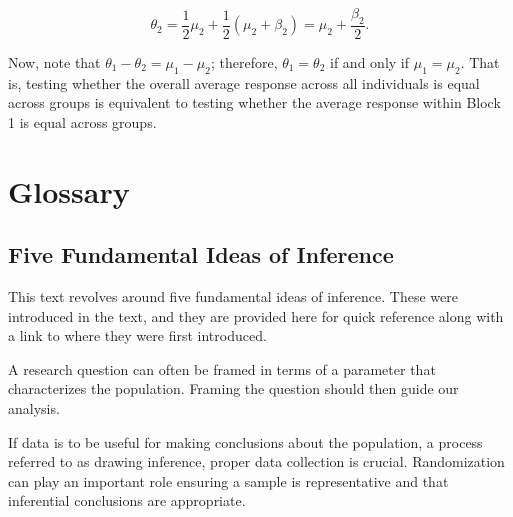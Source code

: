 \documentclass[
  letterpaper,
  DIV=11,
  numbers=noendperiod]{scrreprt}
\theoremstyle{definition}
\theoremstyle{definition}
\theoremstyle{plain}
\theoremstyle{remark}
\begin{document}
\[\theta_2 = \frac{1}{2} \mu_2 + \frac{1}{2} \left(\mu_2 + \beta_2\right) = \mu_2 + \frac{\beta_2}{2}.\]

Now, note that \(\theta_1 - \theta_2 = \mu_1 - \mu_2\); therefore,
\(\theta_1 = \theta_2\) if and only if \(\mu_1 = \mu_2\). That is,
testing whether the overall average response across all individuals is
equal across groups is equivalent to testing whether the average
response within Block 1 is equal across groups.

\hypertarget{glossary}{%
\chapter{Glossary}\label{glossary}}

\hypertarget{five-fundamental-ideas-of-inference}{%
\section{Five Fundamental Ideas of
Inference}\label{five-fundamental-ideas-of-inference}}

This text revolves around five fundamental ideas of inference. These
were introduced in the text, and they are provided here for quick
reference along with a link to where they were first introduced.

\begin{tcolorbox}[enhanced jigsaw, rightrule=.15mm, colbacktitle=quarto-callout-important-color!10!white, arc=.35mm, leftrule=.75mm, toprule=.15mm, titlerule=0mm, title=\textcolor{quarto-callout-important-color}{\faExclamation}\hspace{0.5em}{Fundamental Idea I (Chapter~\ref{sec-questions})}, toptitle=1mm, bottomrule=.15mm, bottomtitle=1mm, colback=white, breakable, opacitybacktitle=0.6, coltitle=black, opacityback=0, left=2mm, colframe=quarto-callout-important-color-frame]

A research question can often be framed in terms of a parameter that
characterizes the population. Framing the question should then guide our
analysis.

\end{tcolorbox}

\begin{tcolorbox}[enhanced jigsaw, rightrule=.15mm, colbacktitle=quarto-callout-important-color!10!white, arc=.35mm, leftrule=.75mm, toprule=.15mm, titlerule=0mm, title=\textcolor{quarto-callout-important-color}{\faExclamation}\hspace{0.5em}{Fundamental Idea II (Chapter~\ref{sec-data})}, toptitle=1mm, bottomrule=.15mm, bottomtitle=1mm, colback=white, breakable, opacitybacktitle=0.6, coltitle=black, opacityback=0, left=2mm, colframe=quarto-callout-important-color-frame]

If data is to be useful for making conclusions about the population, a
process referred to as drawing inference, proper data collection is
crucial. Randomization can play an important role ensuring a sample is
representative and that inferential conclusions are appropriate.

\end{tcolorbox}
\end{document}
